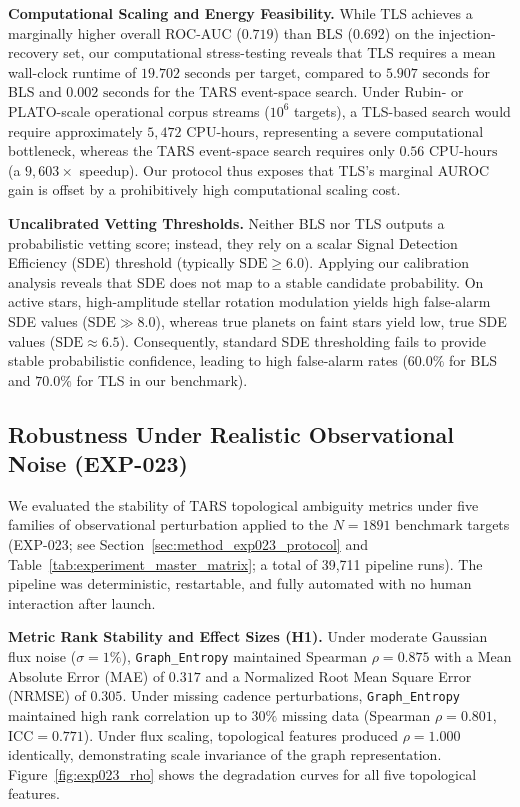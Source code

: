 \textbf{Computational Scaling and Energy Feasibility.}
While TLS achieves a marginally higher overall ROC-AUC ($0.719$) than BLS ($0.692$) on the injection-recovery set, our computational stress-testing reveals that TLS requires a mean wall-clock runtime of $19.702\text{ seconds}$ per target, compared to $5.907\text{ seconds}$ for BLS and $0.002\text{ seconds}$ for the TARS event-space search. Under Rubin- or PLATO-scale operational corpus streams ($10^6$ targets), a TLS-based search would require approximately $5{,}472\text{ CPU-hours}$, representing a severe computational bottleneck, whereas the TARS event-space search requires only $0.56\text{ CPU-hours}$ (a $9{,}603\times$ speedup). Our protocol thus exposes that TLS's marginal AUROC gain is offset by a prohibitively high computational scaling cost.

\textbf{Uncalibrated Vetting Thresholds.}
Neither BLS nor TLS outputs a probabilistic vetting score; instead, they rely on a scalar Signal Detection Efficiency (SDE) threshold (typically $\text{SDE} \ge 6.0$). Applying our calibration analysis reveals that SDE does not map to a stable candidate probability. On active stars, high-amplitude stellar rotation modulation yields high false-alarm SDE values ($\text{SDE} \gg 8.0$), whereas true planets on faint stars yield low, true SDE values ($\text{SDE} \approx 6.5$). Consequently, standard SDE thresholding fails to provide stable probabilistic confidence, leading to high false-alarm rates ($60.0\%$ for BLS and $70.0\%$ for TLS in our benchmark).

\subsection{Robustness Under Realistic Observational Noise (EXP-023)} \label{sec:results_exp023} \label{sec:exp023}

We evaluated the stability of TARS topological ambiguity metrics under five families of observational perturbation applied to the $N=1891$ benchmark targets (EXP-023; see Section~\ref{sec:method_exp023_protocol} and Table~\ref{tab:experiment_master_matrix}; a total of 39,711 pipeline runs). The pipeline was deterministic, restartable, and fully automated with no human interaction after launch.

\textbf{Metric Rank Stability and Effect Sizes (H1).} Under moderate Gaussian flux noise
($\sigma = 1\%$), \texttt{Graph\_Entropy} maintained Spearman $\rho = 0.875$
with a Mean Absolute Error (MAE) of $0.317$ and a Normalized Root Mean Square Error (NRMSE) of $0.305$.
Under missing cadence perturbations, \texttt{Graph\_Entropy} maintained high rank correlation
up to $30\%$ missing data (Spearman $\rho = 0.801$, $\text{ICC} = 0.771$). Under flux scaling,
topological features produced $\rho = 1.000$ identically, demonstrating scale invariance of the graph representation.
Figure~\ref{fig:exp023_rho} shows the degradation curves for all five topological features.

